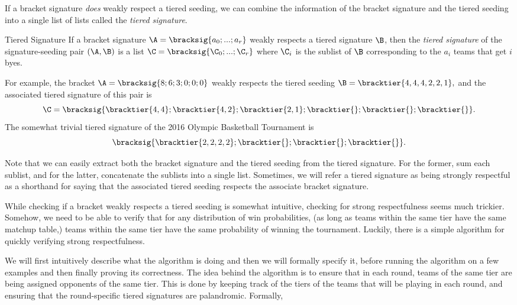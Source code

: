 {    

    If a bracket signature \textit{does} weakly respect a tiered seeding, we can combine the information of the bracket signature and the tiered seeding into a single list of lists called the \textit{tiered signature}.

    \begin{definition}{Tiered Signature}{}
        If a bracket signature $\A = \bracksig{a_0; ...; a_r}$ weakly respects a tiered signature $\B$, then the \textit{tiered signature} of the signature-seeding pair $(\A, \B)$ is a list $\C = \bracksig{\C_0; ...; \C_r}$ where $\C_i$ is the sublist of $\B$ corresponding to the $a_i$ teams that get $i$ byes.
    \end{definition}

    For example, the bracket $\A = \bracksig{8;6;3;0;0;0}$ weakly respects the tiered seeding $\B = \bracktier{4,4,4,2,2,1},$ and the associated tiered signature of this pair is $$\C = \bracksig{\bracktier{4, 4};\bracktier{4,2};\bracktier{2,1};\bracktier{};\bracktier{};\bracktier{}}.$$ The somewhat trivial tiered signature of the 2016 Olympic Basketball Tournament is $$\bracksig{\bracktier{2, 2, 2, 2};\bracktier{};\bracktier{};\bracktier{}}.$$

    Note that we can easily extract both the bracket signature and the tiered seeding from the tiered signature. For the former, sum each sublist, and for the latter, concatenate the sublists into a single list. Sometimes, we will refer a tiered signature as being strongly respectful as a shorthand for saying that the associated tiered seeding respects the associate bracket signature.

    While checking if a bracket weakly respects a tiered seeding is somewhat intuitive, checking for strong respectfulness seems much trickier. Somehow, we need to be able to verify that for any distribution of win probabilities, (as long as teams within the same tier have the same matchup table,) teams within the same tier have the same probability of winning the tournament. Luckily, there is a simple algorithm for quickly verifying strong respectfulness.
    
    We will first intuitively describe what the algorithm is doing and then we will formally specify it, before running the algorithm on a few examples and then finally proving its correctness. The idea behind the algorithm is to ensure that in each round, teams of the same tier are being assigned opponents of the same tier. This is done by keeping track of the tiers of the teams that will be playing in each round, and ensuring that the round-specific tiered signatures are palandromic. Formally,

}
